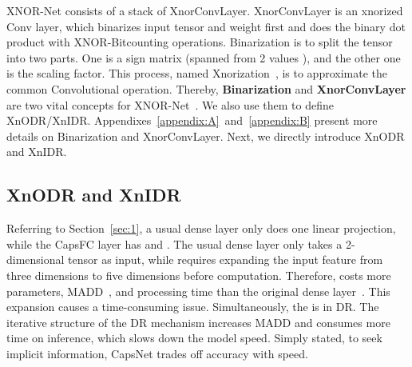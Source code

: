 \documentclass[sn-mathphys,iicol,Numbered]{sn-jnl}
\begin{document}
XNOR-Net consists of a stack of XnorConvLayer. XnorConvLayer is an xnorized Conv layer, which binarizes input tensor and weight first and does the binary dot product with XNOR-Bitcounting operations. Binarization is to split the tensor into two parts. One is a sign matrix (spanned from 2 values ), and the other one is the scaling factor. This process, named Xnorization~\cite{A2_xnor}, is to approximate the common Convolutional operation. Thereby, \textbf{Binarization} and \textbf{XnorConvLayer} are two vital concepts for XNOR-Net~\cite{A2_xnor}. We also use them to define XnODR/XnIDR. Appendixes~\ref{appendix:A}~and~\ref{appendix:B} present more details on Binarization and XnorConvLayer. Next, we directly introduce XnODR and XnIDR. 

\subsection{XnODR and XnIDR} \label{sec:3.3}

Referring to Section~\ref{sec:1}, a usual dense layer only does one linear projection, while the CapsFC layer has  and . The usual dense layer only takes a 2-dimensional tensor as input, while  requires expanding the input feature from three dimensions to five dimensions before computation. Therefore,  costs more parameters, MADD~\cite{A18_MBV2}, and processing time than the original dense layer~\cite{A18_MBV2}. This expansion causes a time-consuming issue. Simultaneously, the  is in DR. The iterative structure of the DR mechanism increases MADD and consumes more time on inference, which slows down the model speed. Simply stated, to seek implicit information, CapsNet trades off accuracy with speed.
\end{document}
